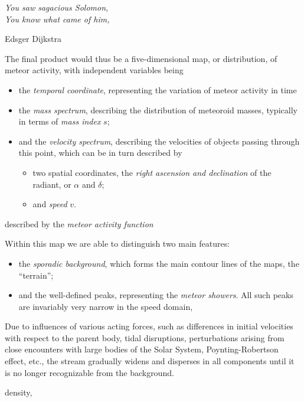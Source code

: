 \epigraph{\it
    You saw sagacious Solomon,\\
    You know what came of him,
}{\vspace{2mm}Edsger Dijkstra}

The final product would thus be a five-dimensional map, or distribution, of meteor activity, with independent variables being
\begin{itemize}
    \item the \emph{temporal coordinate}, representing the variation of meteor activity in time    \item the \emph{mass spectrum}, describing the distribution of meteoroid masses, typically in terms of \textit{mass index} $s$;
    \item and the \emph{velocity spectrum}, describing the velocities of objects passing through this point, which can be in turn described by
        \begin{itemize}
            \item two spatial coordinates, the \emph{right ascension and declination} of the radiant, or $\alpha$ and $\delta$;
            \item and \emph{speed} $v$.
        \end{itemize}
\end{itemize}

described by the \emph{meteor activity function}

\citep{balaz+2020}

Within this map we are able to distinguish two main features:
\begin{itemize}
    \item the \emph{sporadic background}, which forms the main contour lines of the maps, the ``terrain'';
    \item and the well-defined peaks, representing the \emph{meteor showers}. All such peaks are invariably
        very narrow in the speed domain, 
    
\end{itemize}
    Due to influences of various acting forces, such as differences
    in initial velocities with respect to the parent body, tidal disruptions, 
    perturbations arising from close encounters with large bodies of the Solar System,
    Poynting-Robertson effect, etc., the stream
    gradually widens and disperses in all components until it is no longer recognizable from the background.

    density, 


